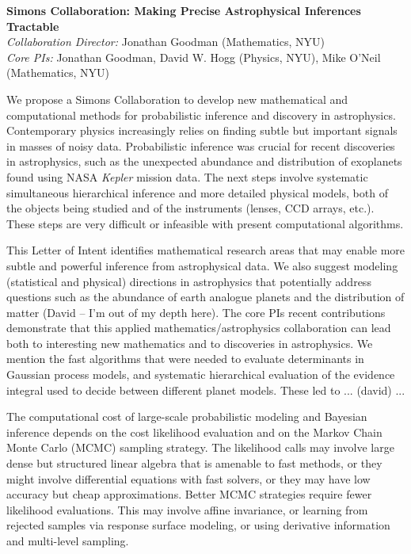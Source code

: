 \documentclass[12pt]{article}
\newcommand{\project}[1]{\textsl{#1}}
\begin{document}
\sloppy\sloppypar\thispagestyle{empty}

\begin{center}
\textbf{Simons Collaboration: Making Precise Astrophysical Inferences
Tractable}\\
\textit{Collaboration Director:} Jonathan Goodman (Mathematics, NYU)\\
\textit{Core PIs:} Jonathan Goodman, David W. Hogg (Physics, NYU), Mike O'Neil (Mathematics, NYU)
\end{center}
\smallskip


We propose a Simons Collaboration to develop new mathematical and computational 
methods for probabilistic inference and discovery in astrophysics.
Contemporary physics increasingly relies on
finding subtle but important signals in masses of noisy data.
Probabilistic inference was crucial for recent discoveries in
astrophysics, such as the unexpected abundance and distribution of
exoplanets found using NASA \project{Kepler} mission data.
The next steps involve systematic simultaneous hierarchical inference
and more detailed physical models, both of the objects being studied and of
the instruments (lenses, CCD arrays, etc.).
These steps are very difficult or infeasible
with present computational algorithms.

This Letter of Intent identifies mathematical research areas that may enable
more subtle and powerful inference from astrophysical data.
We also suggest modeling (statistical and physical) directions in
astrophysics that potentially address questions such as the abundance of earth analogue
planets and the distribution of matter (David -- I'm out of my depth here).
The core PIs recent contributions demonstrate that this applied mathematics/astrophysics
collaboration can lead both to interesting new mathematics and to discoveries
in astrophysics.
We mention the fast algorithms that were needed to evaluate determinants in
Gaussian process models, and systematic hierarchical evaluation of the evidence
integral used to decide between different planet models.
These led to ... (david) ... 

The computational cost of large-scale probabilistic modeling and Bayesian 
inference depends on the cost likelihood evaluation and on 
the Markov Chain Monte Carlo (MCMC) sampling strategy.
The likelihood calls may involve large dense but structured linear algebra
that is amenable to fast methods, or they might involve differential 
equations with fast solvers, or they may have low accuracy but cheap 
approximations.
Better MCMC strategies require fewer likelihood evaluations.
This may involve affine invariance, or learning from rejected samples
via response surface modeling, or using derivative information and
multi-level sampling.
\end{document}
